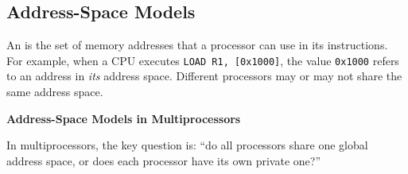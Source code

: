 \subsection{Address-Space Models}

An  is the set of memory addresses that a processor can use in its instructions. For example, when a CPU executes \texttt{LOAD R1, [0x1000]}, the value \texttt{0x1000} refers to an address in \emph{its} address space. Different processors may or may not share the same address space.

\highspace
\begin{flushleft}
    \textcolor{Green3}{ \textbf{Address-Space Models in Multiprocessors}}
\end{flushleft}
In multiprocessors, the key question is: ``do all processors share one global address space, or does each processor have its own private one?''

